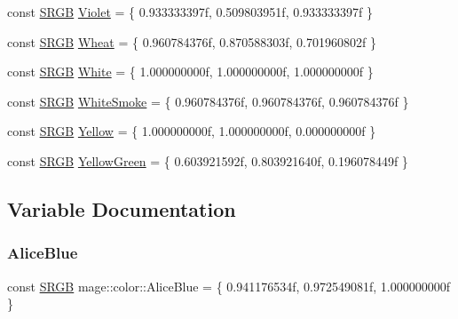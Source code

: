 \begin{DoxyCompactItemize}
\item 
const \hyperlink{structmage_1_1_s_r_g_b}{S\+R\+GB} \hyperlink{namespacemage_1_1color_a74cf2fb38b14a5967a005a96bc7235aa}{Violet} = \{ 0.\+933333397f, 0.\+509803951f, 0.\+933333397f \}
\item 
const \hyperlink{structmage_1_1_s_r_g_b}{S\+R\+GB} \hyperlink{namespacemage_1_1color_a23729819ad160712bf0b57590ccf3ff9}{Wheat} = \{ 0.\+960784376f, 0.\+870588303f, 0.\+701960802f \}
\item 
const \hyperlink{structmage_1_1_s_r_g_b}{S\+R\+GB} \hyperlink{namespacemage_1_1color_a727b7cc976b22af2949cec8bebdb3e74}{White} = \{ 1.\+000000000f, 1.\+000000000f, 1.\+000000000f \}
\item 
const \hyperlink{structmage_1_1_s_r_g_b}{S\+R\+GB} \hyperlink{namespacemage_1_1color_a772d2000efd8f14d3f8bf1d44161b9c2}{White\+Smoke} = \{ 0.\+960784376f, 0.\+960784376f, 0.\+960784376f \}
\item 
const \hyperlink{structmage_1_1_s_r_g_b}{S\+R\+GB} \hyperlink{namespacemage_1_1color_a7dd7634c14fe1917cfe6de0c6f0427f0}{Yellow} = \{ 1.\+000000000f, 1.\+000000000f, 0.\+000000000f \}
\item 
const \hyperlink{structmage_1_1_s_r_g_b}{S\+R\+GB} \hyperlink{namespacemage_1_1color_ab45afdafcda7e512b8b560f318098d78}{Yellow\+Green} = \{ 0.\+603921592f, 0.\+803921640f, 0.\+196078449f \}
\end{DoxyCompactItemize}


\subsection{Variable Documentation}
\hypertarget{namespacemage_1_1color_a03d390fe7b0d4ca9bf7800de2e8396f8}{}\label{namespacemage_1_1color_a03d390fe7b0d4ca9bf7800de2e8396f8} 
\subsubsection{\texorpdfstring{Alice\+Blue}{AliceBlue}}
{\footnotesize\ttfamily const \hyperlink{structmage_1_1_s_r_g_b}{S\+R\+GB} mage\+::color\+::\+Alice\+Blue = \{ 0.\+941176534f, 0.\+972549081f, 1.\+000000000f \}}

\hypertarget{namespacemage_1_1color_a78d58145e7293782912e3806bce43059}{}\label{namespacemage_1_1color_a78d58145e7293782912e3806bce43059} 
